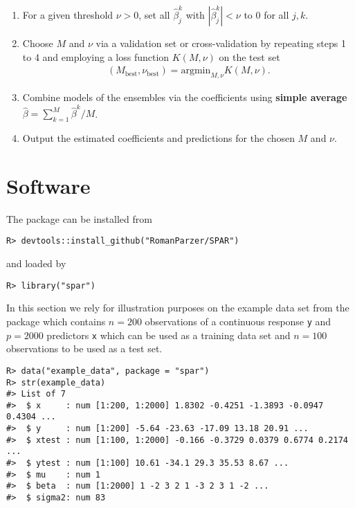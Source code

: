 \documentclass[
  article]{jss}
\begin{document}
\begin{enumerate}
\def\labelenumi{\arabic{enumi}.}
\setcounter{enumi}{4}
\item
  For a given threshold \(\nu>0\), set all \(\hat\beta_j^k\) with
  \(|\hat\beta_j^k|<\nu\) to \(0\) for all \(j,k\).
\item
  Choose \(M\) and \(\nu\) via a validation set or cross-validation by
  repeating steps 1 to 4 and employing a loss function \(K(M, \nu)\) on
  the test set \begin{align*}
      (M_{\text{best}},\nu_{\text{best}}) = \text{argmin}_{M,\nu}K(M,\nu).
    \end{align*}
\item
  Combine models of the ensembles via the coefficients using
  \textbf{simple average} \(\hat \beta = \sum_{k=1}^M\hat \beta^k / M\).
\item
  Output the estimated coefficients and predictions for the chosen \(M\)
  and \(\nu\).
\end{enumerate}

\section{Software}\label{sec-software}

The package can be installed from 

\begin{verbatim}
R> devtools::install_github("RomanParzer/SPAR")
\end{verbatim}

and loaded by

\begin{verbatim}
R> library("spar")
\end{verbatim}

In this section we rely for illustration purposes on the example data
set from the package which contains \(n=200\) observations of a
continuous response \texttt{y} and \(p=2000\) predictors \texttt{x}
which can be used as a training data set and \(n=100\) observations to
be used as a test set.

\begin{verbatim}
R> data("example_data", package = "spar")
R> str(example_data)
#> List of 7
#>  $ x     : num [1:200, 1:2000] 1.8302 -0.4251 -1.3893 -0.0947 0.4304 ...
#>  $ y     : num [1:200] -5.64 -23.63 -17.09 13.18 20.91 ...
#>  $ xtest : num [1:100, 1:2000] -0.166 -0.3729 0.0379 0.6774 0.2174 ...
#>  $ ytest : num [1:100] 10.61 -34.1 29.3 35.53 8.67 ...
#>  $ mu    : num 1
#>  $ beta  : num [1:2000] 1 -2 3 2 1 -3 2 3 1 -2 ...
#>  $ sigma2: num 83
\end{verbatim}
\end{document}
